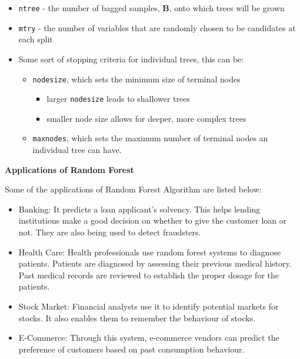 \documentclass[
  a4paper,
  twoside,
  openright]{book}
\providecommand{\tightlist}{%
  \setlength{\itemsep}{0pt}\setlength{\parskip}{0pt}}
\theoremstyle{definition}
\theoremstyle{definition}
\theoremstyle{definition}
\theoremstyle{definition}
\theoremstyle{remark}
\begin{document}
\begin{itemize}
\tightlist
\item
  \texttt{ntree} - the number of bagged samples, \(\boldsymbol{B}\), onto which trees will be grown
\item
  \texttt{mtry} - the number of variables that are randomly chosen to be candidates at each split
\item
  Some sort of stopping criteria for individual trees, this can be:

  \begin{itemize}
  \tightlist
  \item
    \texttt{nodesize}, which sets the minimum size of terminal nodes

    \begin{itemize}
    \tightlist
    \item
      larger \texttt{nodesize} leads to shallower trees
    \item
      smaller node size allows for deeper, more complex trees
    \end{itemize}
  \item
    \texttt{maxnodes}, which sets the maximum number of terminal nodes an individual tree can have.
  \end{itemize}
\end{itemize}

\textbf{Applications of Random Forest}

Some of the applications of Random Forest Algorithm are listed below:

\begin{itemize}
\tightlist
\item
  Banking: It predicts a loan applicant's solvency. This helps lending institutions make a good decision on whether to give the customer loan or not. They are also being used to detect fraudsters.
\item
  Health Care: Health professionals use random forest systems to diagnose patients. Patients are diagnosed by assessing their previous medical history. Past medical records are reviewed to establish the proper dosage for the patients.
\item
  Stock Market: Financial analysts use it to identify potential markets for stocks. It also enables them to remember the behaviour of stocks.
\item
  E-Commerce: Through this system, e-commerce vendors can predict the preference of customers based on past consumption behaviour.
\end{itemize}
\end{document}
